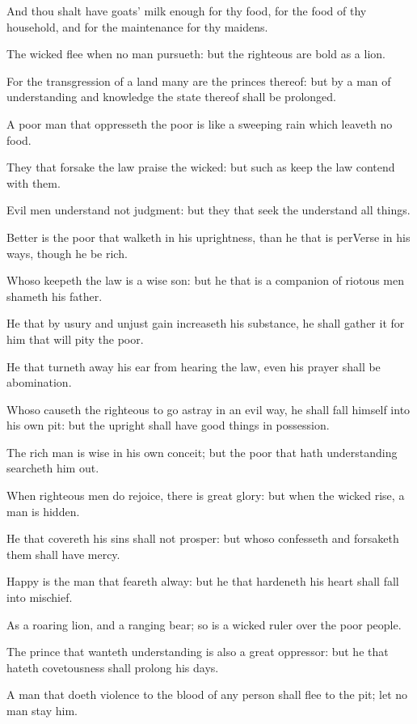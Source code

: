 \Verse And thou shalt have goats' milk enough for thy food, for the food of thy household, and for the maintenance for thy maidens.


\Chapter
\Verse The wicked flee when no man pursueth: but the righteous are bold as a lion.

\Verse For the transgression of a land many are the princes thereof: but by a man of understanding and knowledge the state thereof shall be prolonged.

\Verse A poor man that oppresseth the poor is like a sweeping rain which leaveth no food.

\Verse They that forsake the law praise the wicked: but such as keep the law contend with them.

\Verse Evil men understand not judgment: but they that seek the \LORD understand all things.

\Verse Better is the poor that walketh in his uprightness, than he that is perVerse in his ways, though he be rich.

\Verse Whoso keepeth the law is a wise son: but he that is a companion of riotous men shameth his father.

\Verse He that by usury and unjust gain increaseth his substance, he shall gather it for him that will pity the poor.

\Verse He that turneth away his ear from hearing the law, even his prayer shall be abomination.

\Verse Whoso causeth the righteous to go astray in an evil way, he shall fall himself into his own pit: but the upright shall have good things in possession.

\Verse The rich man is wise in his own conceit; but the poor that hath understanding searcheth him out.

\Verse When righteous men do rejoice, there is great glory: but when the wicked rise, a man is hidden.

\Verse He that covereth his sins shall not prosper: but whoso confesseth and forsaketh them shall have mercy.

\Verse Happy is the man that feareth alway: but he that hardeneth his heart shall fall into mischief.

\Verse As a roaring lion, and a ranging bear; so is a wicked ruler over the poor people.

\Verse The prince that wanteth understanding is also a great oppressor: but he that hateth covetousness shall prolong his days.

\Verse A man that doeth violence to the blood of any person shall flee to the pit; let no man stay him.

